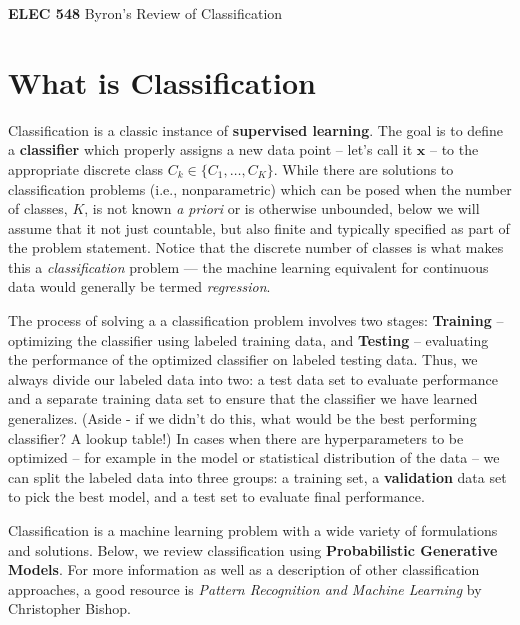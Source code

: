 \documentclass[11pt]{article}
\newcommand{\xb}{\mathbf{x}}
\begin{document}
\setmainfont{Myriad Pro} %

\begin{center}
\large
\textbf{ELEC 548} Byron's Review of Classification
\end{center}

\section{What is Classification}
Classification is a classic instance of \textbf{supervised learning}. The goal is to define a \textbf{classifier} which properly assigns a new data point -- let's call it $\xb$ -- to the appropriate discrete class $C_k \in \lbrace C_1, \ldots, C_K \rbrace$. While there are solutions to classification problems (i.e., nonparametric) which can be posed when the number of classes, $K$, is not known \textit{a priori} or is otherwise unbounded, below we will assume that it not just countable, but also  finite and typically specified as part of the problem statement. Notice that the discrete number of classes is what makes this a \textit{classification} problem --- the machine learning equivalent for continuous data would generally be termed \textit{regression}. 

The process of solving a a classification problem involves two stages: \textbf{Training}  -- optimizing the classifier using labeled training data, and \textbf{Testing} -- evaluating  the performance of the optimized classifier on labeled testing data. Thus, we always divide our labeled data into two: a test data set to evaluate performance and a separate training  data set to ensure that the classifier we have learned generalizes. (Aside - if we didn't do this, what would be the best performing classifier? A lookup table!)  In cases when there are hyperparameters to be optimized -- for example in the model or statistical distribution of the data -- we can split the labeled data into three groups: a training set, a \textbf{validation} data set to pick the best model, and a test set to evaluate final performance.

Classification is a machine learning problem with a wide variety of formulations and solutions. Below, we review classification using \textbf{Probabilistic Generative Models}. For more information as well as a description of other classification approaches, a good resource is \textit{Pattern Recognition and Machine Learning} by Christopher Bishop.
\end{document}
